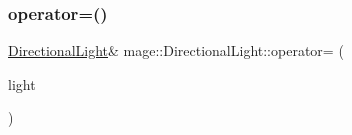 \hypertarget{classmage_1_1_directional_light_a9bf3d8fa724b46b7512c74e51e1278c0}{}\label{classmage_1_1_directional_light_a9bf3d8fa724b46b7512c74e51e1278c0} 
\subsubsection{\texorpdfstring{operator=()}{operator=()}\hspace{0.1cm}{\footnotesize\ttfamily [2/2]}}
{\footnotesize\ttfamily \hyperlink{classmage_1_1_directional_light}{Directional\+Light}\& mage\+::\+Directional\+Light\+::operator= (\begin{DoxyParamCaption}\item[{\hyperlink{classmage_1_1_directional_light}{Directional\+Light} \&\&}]{light }\end{DoxyParamCaption})\hspace{0.3cm}{\ttfamily [default]}}

